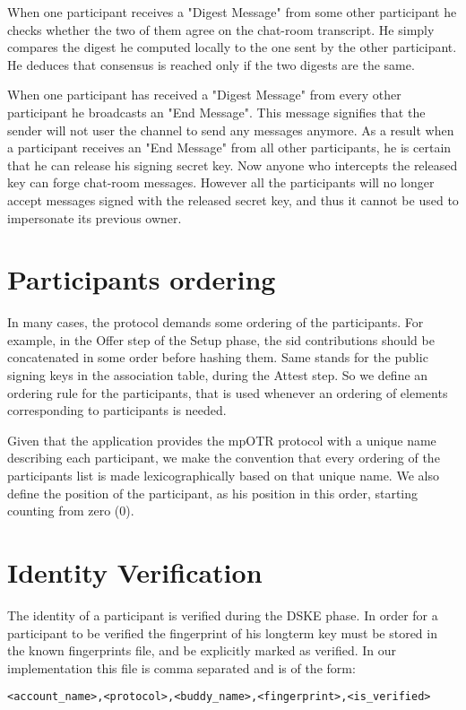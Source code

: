 When one participant receives a "Digest Message" from some other participant he checks whether the two of them agree on the chat-room transcript.
He simply compares the digest he computed locally to the one sent by the other participant.
He deduces that consensus is reached only if the two digests are the same.

When one participant has received a "Digest Message" from every other participant he broadcasts an "End Message".
This message signifies that the sender will not user the channel to send any messages anymore.
As a result when a participant receives an "End Message" from all other participants, he is certain that he can release his signing secret key.
Now anyone who intercepts the released key can forge chat-room messages.
However all the participants will no longer accept messages signed with the released secret key, and thus it cannot be used to impersonate its previous owner.


\section{Participants ordering}
In many cases, the protocol demands some ordering of the participants. For example, in the Offer step of the Setup phase, the sid contributions should be concatenated in some order before hashing them. Same stands for the public signing keys in the association table, during the Attest step. So we define an ordering rule for the participants, that is used whenever an ordering of elements corresponding to participants is needed.

Given that the application provides the mpOTR protocol with a unique name describing each participant, we make the convention that every ordering of the participants list is made lexicographically based on that unique name. We also define the position of the participant, as his position in this order, starting counting from zero (0).

\section{Identity Verification}
The identity of a participant is verified during the DSKE phase.
In order for a participant to be verified the fingerprint of his longterm key must be stored in the known fingerprints file, and be explicitly marked as verified.
In our implementation this file is comma separated and is of the form:

\begin{verbatim}
<account_name>,<protocol>,<buddy_name>,<fingerprint>,<is_verified>
\end{verbatim}

